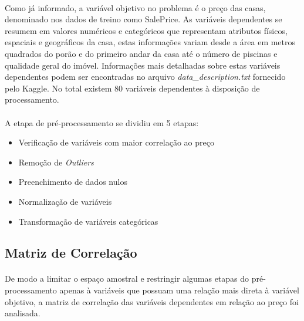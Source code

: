 \documentclass{article}
\begin{document}
	\paragraph{}Como já informado, a variável objetivo no problema é o preço das casas, denominado nos dados de treino como SalePrice. As variáveis dependentes se resumem em valores numéricos e categóricos que representam atributos físicos, espaciais e geográficos da casa, estas informações variam desde a área em metros quadrados do porão e do primeiro andar da casa até o número de piscinas e qualidade geral do imóvel. Informações mais detalhadas sobre estas variáveis dependentes podem ser encontradas no arquivo \textit{data\_description.txt} fornecido pelo Kaggle. No total existem 80 variáveis dependentes à disposição de processamento.
	
	\paragraph{}A etapa de pré-processamento se dividiu em 5 etapas:
	\begin{itemize}
		\item Verificação de variáveis com maior correlação ao preço
		\item Remoção de \textit{Outliers}
		\item Preenchimento de dados nulos
		\item Normalização de variáveis
		\item Transformação de variáveis categóricas
	\end{itemize}
	
		\subsection{Matriz de Correlação}
			\paragraph{}De modo a limitar o espaço amostral e restringir algumas etapas do pré-processamento apenas à variáveis que possuam uma relação mais direta à variável objetivo, a matriz de correlação das variáveis dependentes em relação ao preço foi analisada.
			
\end{document}
